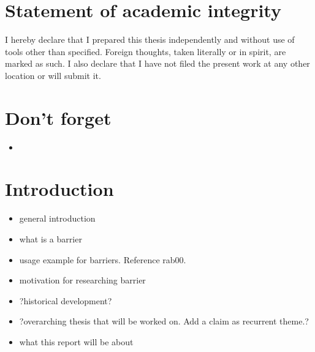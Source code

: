 \documentclass[a4paper, 10pt]{article}
\begin{document}
\section*{Statement of academic integrity}
I hereby declare that I prepared this thesis independently and without use of tools other than specified. Foreign thoughts, taken literally or in spirit, are marked as such. I also declare that I have not filed the present work at any other location or will submit it.

\pagebreak
\newpage \thispagestyle{empty} \mbox{}
\pagebreak

\renewcommand{\contentsname}{Table of contents}
\tableofcontents

\pagebreak
\newpage \thispagestyle{empty} \mbox{}
\pagebreak

\section{Don't forget}
\begin{itemize}
	\item 
\end{itemize}

\section{Introduction}
\begin{itemize}
	\item general introduction
	\item what is a barrier
	\item usage example for barriers. Reference rab00.
	\item motivation for researching barrier
	\item ?historical development?
	\item ?overarching thesis that will be worked on. Add a claim as recurrent theme.?
	\item what this report will be about
\end{itemize}


\end{document}
